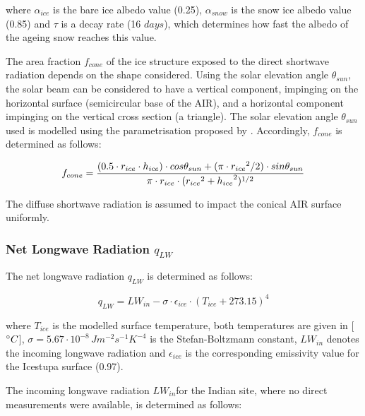 \documentclass[utf8]{frontiersSCNS} %
\begin{document}
where $\alpha_{ice}$ is the bare ice albedo value (0.25), $\alpha_{snow}$ is the snow ice albedo value (0.85) and $\tau$
is a decay rate (16 $days$), which determines how fast the albedo of the ageing snow reaches this value.

The area fraction $f_{cone}$ of the ice structure exposed to the direct shortwave radiation depends on the shape
considered. Using the solar elevation angle $\theta_{sun}$, the solar beam can be considered to have a vertical
component, impinging on the horizontal surface (semicircular base of the AIR), and a horizontal component impinging on
the vertical cross section (a triangle). The solar elevation angle $\theta_{sun}$ used is modelled using the
parametrisation proposed by \cite{Woolf_1968}. Accordingly, $f_{cone}$ is determined as follows:

\begin{equation}
	\begin{split}
		f_{cone}& =\frac{(0.5 \cdot r_{ice} \cdot h_{ice}) \cdot cos \theta_{sun} +(\pi \cdot
			{r_{ice}}^2/2) \cdot sin \theta_{sun} }{\pi \cdot r_{ice} \cdot ({r_{ice}}^2+{h_{ice}}^2)^{1/2}}\\
	\end{split}
	\label{eqn:f_{cone}}
\end{equation}

The diffuse shortwave radiation is assumed to impact the conical AIR surface uniformly.

\subsubsection{Net Longwave Radiation \texorpdfstring{$q_{LW}$}{Lg}}

The net longwave radiation $q_{LW}$ is determined as follows:

\begin{equation}
	q_{LW}= LW_{in}-\sigma \cdot \epsilon_{ice} \cdot {(T_{ice}+ 273.15)}^4
	\label{eqn:LW}
\end{equation}

where $T_{ice}$ is the modelled surface temperature, both temperatures are given in [$\degree C$],
$\sigma=5.67\cdot10^{-8}\,Jm^{-2}s^{-1}K^{-4}$ is the Stefan-Boltzmann constant, $LW_{in}$ denotes the incoming longwave
radiation and $\epsilon_{ice}$ is the corresponding emissivity value for the Icestupa surface (0.97).

The incoming longwave radiation $LW_{in}$for the Indian site, where no direct measurements were available, is determined
as follows:
\end{document}
